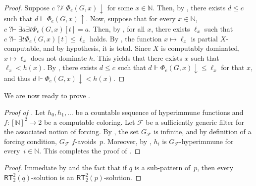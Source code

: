 \documentclass{article}
\def\F{\mathcal{F}}
\newcommand{\qvdash}{\operatorname{{?}{\vdash}}}
\newcommand{\nqvdash}{\operatorname{{?}{\nvdash}}}
\newcommand{\RT}[0]{\mathsf{RT}}
\newcommand{\NN}[0]{\mathbb{N}}
\def\NN{\mathbb{N}}
\def\F{\mathcal{F}}
\numberwithin{theorem}{section}
\theoremstyle{definition}
\newtheorem{corollary}[theorem]{Corollary}
\begin{document}
\begin{proof}


    Suppose $c \nqvdash \Phi_e(G,x) \downarrow$ for some $x \in \NN$. Then, by , there exists $d \leq c$ such that $d \Vdash \Phi_e(G,x)\uparrow$. Now, suppose that for every $x \in \NN$, $c \qvdash \exists a \exists t \Phi_e(G,x)[t]=a$. Then, by , for all $x$, there exists $\ell_x$ such that $c \qvdash \exists t \Phi_e(G,x)[t] \leq \ell_x$ holds. By , the function $x \mapsto \ell_x$ is partial $X$-computable, and by hypothesis, it is total. Since $X$ is computably dominated, $x \mapsto \ell_x$ does not dominate $h$. This yields that there exists $x$ such that $\ell_x < h(x)$. By , there exists $d \leq c$ such that $d \Vdash \Phi_e(G,x)\downarrow \leq \ell_x$ for that $x$, and thus $d \Vdash \Phi_e(G,x)\downarrow < h(x)$.
\end{proof}



We are now ready to prove . 


\begin{proof}[Proof of ]
Let $h_0, h_1, \dots$ be a countable sequence of hyperimmune functions and $f : [\NN]^2 \to 2$ be a computable coloring. 
Let $\F$ be a sufficiently generic filter for the associated notion of forcing. By , the set $G_\F$ is infinite, and by definition of a forcing condition, $G_\F$ $f$-avoids~$p$. Moreover, by , $h_i$ is $G_\F$-hyperimmune for every~$i \in \NN$.
This completes the proof of .
\end{proof}


\begin{proof}
Immediate by  and the fact that if $q$ is a sub-pattern of~$p$, then every $\RT^2_2(q)$-solution is an $\RT^2_2(p)$-solution.
\end{proof}
\end{document}
